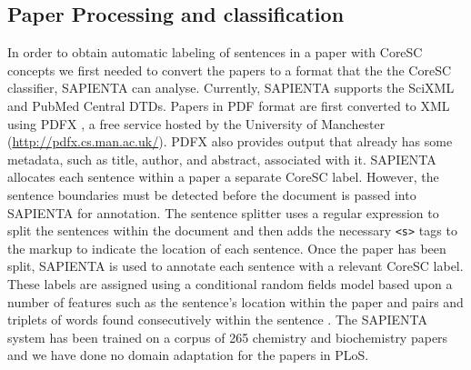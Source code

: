 \documentclass{svmult}
\begin{document}
\subsection*{Paper Processing and classification}
In order to obtain automatic labeling of sentences in a paper with
CoreSC concepts we first needed to convert the papers to a format that
the the CoreSC classifier, SAPIENTA can analyse.  Currently, SAPIENTA
supports the SciXML and PubMed Central DTDs.  Papers in PDF format are
first converted to XML using PDFX \cite{PDFX}, a free service hosted
by the University of Manchester (\url{http://pdfx.cs.man.ac.uk/}).
PDFX also provides output that already has some metadata, such as
title, author, and abstract, associated with it.  SAPIENTA allocates
each sentence within a paper a separate CoreSC label.  However, the
sentence boundaries must be detected before the document is passed
into SAPIENTA for annotation.  The sentence splitter uses a regular
expression to split the sentences within the document and then adds
the necessary \verb|<s>| tags to the markup to indicate the location
of each sentence.  Once the paper has been split, SAPIENTA is used to
annotate each sentence with a relevant CoreSC label.  These labels are
assigned using a conditional random fields model based upon a number
of features such as the sentence's location within the paper and pairs
and triplets of words found consecutively within the sentence
\cite{Liakata2012}.  The SAPIENTA system has been trained on a corpus
of 265 chemistry and biochemistry papers and we have done no domain
adaptation for the papers in PLoS.
\end{document}
